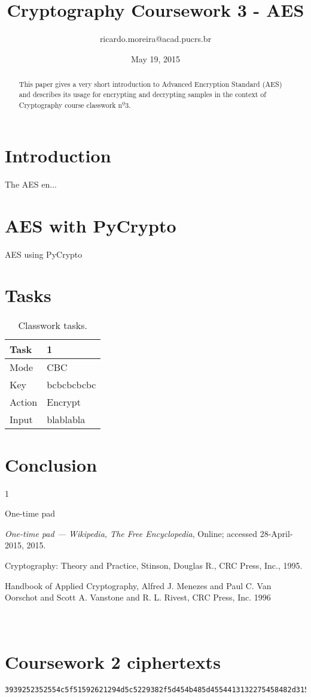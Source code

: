 \documentclass{article}
\title{Cryptography Coursework 3 - AES}
\author{ricardo.moreira@acad.pucrs.br}
\date{May 19, 2015}
\newcommand{\ulo}{\textsuperscript{\b{o}}}
\begin{document}
\maketitle

\begin{abstract}
This paper gives a very short introduction to Advanced Encryption Standard (AES) and describes its usage for encrypting and decrypting samples in the context of Cryptography course classwork n\ulo 3.
\end{abstract}

\section{Introduction}

The AES en...

\section{AES with PyCrypto}

AES using PyCrypto

\section{Tasks}

\begin{table}[!htp]
 \centering
 \label{tasks_table}
  \begin{tabular}{l l}
  Task & 1 \\  \hline
  Mode & CBC \\  \hline
  Key & bcbcbcbcbc \\  \hline
  Action & Encrypt \\  \hline
  Input & blablabla \\  \hline
   \end{tabular}
 \caption{Classwork tasks.}
\end{table}

\section{Conclusion}


\begin{thebibliography}{1}

 One-time pad {\emph{One-time pad --- Wikipedia{,} The Free Encyclopedia},  Online; accessed 28-April-2015, 2015.

 Cryptography: Theory and Practice, Stinson, Douglas R., CRC Press, Inc., 1995.

 Handbook of Applied Cryptography,
 Alfred J. Menezes and Paul C. Van Oorschot and Scott A. Vanstone and R. L. Rivest,
 CRC Press, Inc.
 1996
}

\end{thebibliography}

\newpage
\appendix
\section{\\Coursework 2 ciphertexts } \label{App:AppendixA}
\tiny
\begin{verbatim}
3939252352554c5f51592621294d5c5229382f5d454b485d4554413132275458482d3157415046495c5b2a435a46543527364d5059394847382a2b4b555746404a38202d4c525652455c2a
\end{verbatim}
\end{document}
